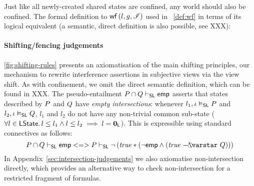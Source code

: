 Just like all newly-created shared states are confined, any world
should also be confined. The formal definition to
$\mathsf{wf}\left( l,g,\mathscr{I} \right)$ used in ~\ref{def:wf} in terms of its logical
equivalent (a semantic, direct definition is also possible, see XXX):


\paragraph{Shifting/fencing judgements}
\fig\ref{fig:shifting-rules} presents an axiomatisation of the main
shifting principles, our mechanism to rewrite interference assertions
in subjective views via the \shiftRule view shift. As with
confinement, we omit the direct semantic definition, which can be
found in XXX.  The pseudo-entailment $P \cap Q \vdash_{\textsf{SL}} \mathsf{emp}$
asserts that states described by $P$ and $Q$ have
\emph{empty intersections}: whenever $l_1, \iota \mathrel{\vDash_{\mathsf{SL}}} P$ and
$l_2, \iota \mathrel{\vDash_{\mathsf{SL}}} Q$, $l_1$ and $l_2$ do not have any
non-trivial common sub-state ($\forall l \in \mathsf{LState}.\, l \leq l_1 \land l
\leq l_2 \implies l = \mathbf{0}_{\mathsf{L}}$). This is expressible using standard
connectives as follows:
\[
\separate{\lass{P}}{\lass{Q}} <=> \lass{P} \slentails \neg\left( \m{true} * (\neg\emp \land (\m{true} \septraction \lass{Q}) ) \right)
\]
In Appendix~\ref{sec:intersection-judgements} we also axiomatise
non-intersection directly, which provides an alternative way to check
non-intersection for a restricted fragment of formulas.

